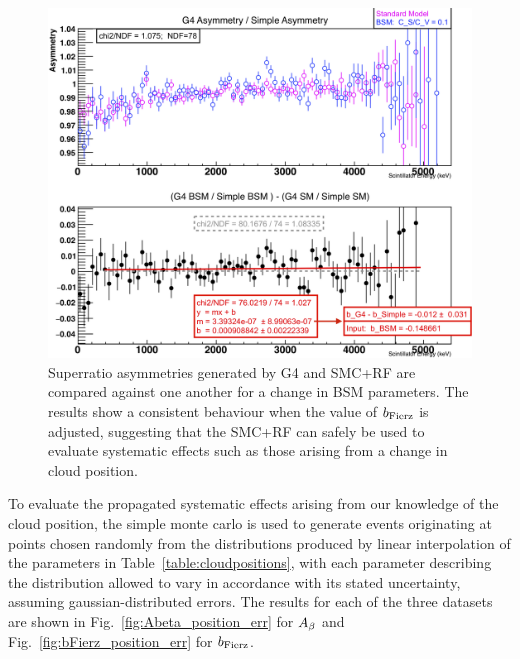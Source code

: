 \begin{figure}[h!!!t]
	\centering
	\includegraphics[width=.999\linewidth]
	{Figures/LineshapeDemo_quasiprelim.png}
\caption[Response Function Comparison]{Superratio asymmetries generated by G4 and SMC+RF are compared against one another for a change in BSM parameters.  The results show a consistent behaviour when the value of $b_{\mathrm{Fierz}}$ is adjusted, suggesting that the SMC+RF can safely be used to evaluate systematic effects such as those arising from a change in cloud position.
}    	
	\label{fig:lineshape_demo}
\end{figure}

To evaluate the propagated systematic effects arising from our knowledge of the cloud position, the simple monte carlo is used to generate events originating at points chosen randomly from the distributions produced by linear interpolation of the parameters in Table~\ref{table:cloudpositions}, with each parameter describing the distribution allowed to vary in accordance with its stated uncertainty, assuming gaussian-distributed errors.  The results for each of the three datasets are shown in Fig.~\ref{fig:Abeta_position_err} for $A_{\beta}$ and Fig.~\ref{fig:bFierz_position_err} for $b_{\mathrm{Fierz}}$.


